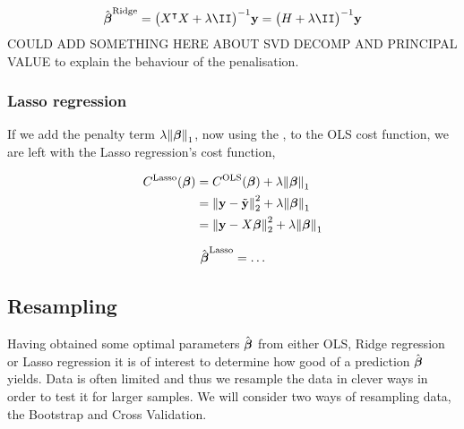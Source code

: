 \begin{align*}
    \optbeta^\text{Ridge} = \big(\hessian + \lambda \II\big)^{-1} \vec{y} = \big(H + \lambda \II\big)^{-1} \vec{y}
\end{align*}
COULD ADD SOMETHING HERE ABOUT SVD DECOMP AND PRINCIPAL VALUE to explain the behaviour of the penalisation. 


\subsubsection{Lasso regression}\label{sec:Lasso}

If we add the penalty term $\lambda \norm{\boldsymbol{\beta}}_1$, now using the \footnotemark, to the OLS cost function, we are left with the Lasso regression's cost function,

\begin{align*}
    C^\text{Lasso}(\boldsymbol{\beta})  &= C^\text{OLS}(\boldsymbol{\beta}) + \lambda \norm{\boldsymbol{\beta}}_1 \\
    &= \norm{\mathbf{y}-\tilde{\mathbf{y}}}_2^{2}  + \lambda \norm{\boldsymbol{\beta}}_{1} \\
    &= \norm{\mathbf{y}-X\boldsymbol{\beta}}_2^{2} + \lambda \norm{\boldsymbol{\beta}}_{1}
\end{align*}

\begin{align*}
    \hat{\boldsymbol{\beta}}^\text{Lasso} = \dots
\end{align*}

\subsection{Resampling}\label{sec:resampling}
Having obtained some optimal parameters $\hat{\boldsymbol{\beta}}$ from either OLS, Ridge regression or Lasso regression it is of interest to determine how good of a prediction $\hat{\boldsymbol{\beta}}$ yields. Data is often limited and thus we resample the data in clever ways in order to test it for larger samples. We will consider two ways of resampling data, the Bootstrap and Cross Validation. 


